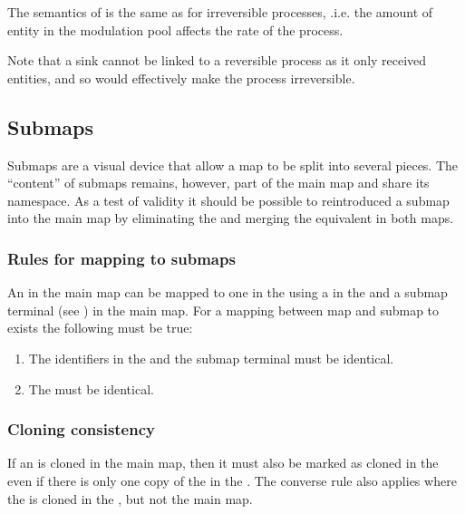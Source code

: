 The semantics of  is the same as for irreversible processes, .i.e. the amount of entity in the modulation pool affects the rate of the process.

Note that a sink cannot be linked to a reversible process as it only received entities, and so would effectively make the process irreversible.

\subsection{Submaps}

Submaps are a visual device that allow a map to be split into several
pieces. The ``content'' of submaps remains, however, part of the main map and share its
namespace. As a test of validity it should be possible to reintroduced
a submap into the main map by eliminating the  and merging
the equivalent  in both maps.

\subsubsection{Rules for mapping to submaps}

An  in the main map can be mapped to one in the 
using a  in the  and a submap terminal (see ) in the main map. For a
mapping between map and submap to exists the following must be true:

\begin{enumerate}
\item The identifiers in the  and the submap terminal must be identical.
\item The  must be identical.
\end{enumerate}

% 

\subsubsection{Cloning consistency}

If an  is cloned in the main map, then it must also be
marked as cloned in the  even if there is only one copy of the 
in the . The converse rule also applies where the
 is cloned in the , but not the main map.


